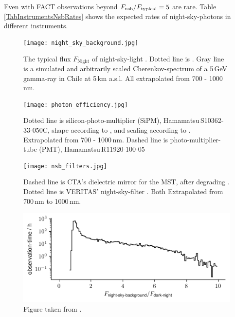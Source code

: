 \documentclass{article}%
\begin{document}
\begin{multicols}{2}
%
Even with FACT observations beyond $F_\text{nsb}{} / F_\text{typical}{} = 5$ are rare.
%
Table \ref{TabInstrumentsNsbRates} shows the expected rates of night-sky-photons in different instruments.
%
\begin{figure}[H]%
\centering%
\texttt{[image: night\_sky\_background.jpg]}%
\caption{
The typical flux $F_\text{Night}$ of night-sky-light \cite{gaug2013night}.
Dotted line is \cite{preuss2002study}.
Gray line is a simulated and arbitrarily scaled Cherenkov-spectrum of a 5\,GeV gamma-ray in Chile at 5\,km a.s.l.
All extrapolated from 700 - 1000\,nm.
}%
\label{fig:nsb}
\end{figure}
%
\begin{figure}[H]%
\centering%
\texttt{[image: photon\_efficiency.jpg]}%
\caption{
Dotted line is silicon-photo-multiplier (SiPM), \mbox{Hamamatsu\,S10362-33-050C}, shape according to \cite{hamamatsu2009mppc}, and scaling according to \cite{anderhub2013design}.
Extrapolated from 700 - 1000\,nm.
Dashed line is photo-multiplier-tube (PMT), \mbox{Hamamatsu\,R11920-100-05} \cite{toyama2013novel}
}%
\label{fig:pde}
\end{figure}
%
\begin{figure}[H]%
\centering%
\texttt{[image: nsb\_filters.jpg]}%
\caption{
Dashed line is CTA's dielectric mirror for the MST, after degrading \cite{pareschi2013status,pareschi2013statusarxiv}.
%
Dotted line is VERITAS' night-sky-filter \cite{archambault2017gamma}.
%
Both Extrapolated from 700\,nm to 1000\,nm.
}%
\label{FigNsbFilter}
\end{figure}
%
\begin{figure}[H]%
\centering%
\includegraphics[width=1.0\linewidth]{observation_time_histogram.png}%
\caption{
Figure taken from \cite{mueller2019phd}.
}%
\label{fig:obstimeFact}
\end{figure}
%
\begin{table}[H]
  \begin{center}
    \begin{tabular}{lcrrr}

\end{tabular}
\end{center}
\end{table}
\end{multicols}
\end{document}
